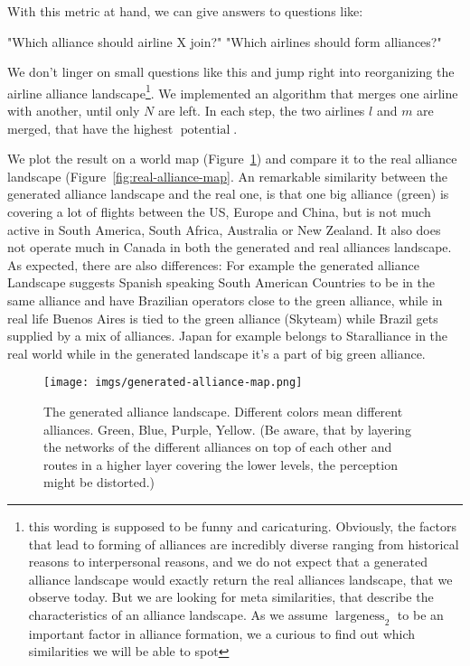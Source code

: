 \documentclass[twocolumn]{tum-article}
\DeclareMathOperator{\Largeness}{largeness}
\DeclareMathOperator{\Potential}{potential}
\begin{document}
With this metric at hand, we can give answers to questions like: 

"Which alliance should airline X join?"
"Which airlines should form alliances?" 


We don't linger on small questions like this and jump right into reorganizing the airline alliance landscape\footnote{this wording is supposed to be funny and caricaturing. Obviously, the factors that lead to forming of alliances are incredibly diverse ranging from historical reasons to interpersonal reasons, and we do not expect that a generated alliance landscape would exactly return the real alliances landscape, that we observe today. But we are looking for meta similarities, that describe the characteristics of an alliance landscape. As we assume $\Largeness_{2}$ to be an important factor in alliance formation, we a curious to find out which similarities we will be able to spot}. We implemented an algorithm that merges one airline with another, until only $N$ are left. In each step, the two airlines $l$ and $m$ are merged, that have the highest $\Potential$.

We plot the result on a world map (Figure~\ref{fig:generated-alliance-map}) and compare it to the real alliance landscape (Figure~\ref{fig:real-alliance-map}. An remarkable similarity between the generated alliance landscape and the real one, is that one big alliance (green) is covering a lot of flights between the US, Europe and China, but is not much active in South America, South Africa, Australia or New Zealand. It also does not operate much in Canada in both the generated and real alliances landscape. 
As expected, there are also differences: For example the generated alliance Landscape suggests Spanish speaking South American Countries to be in the same alliance and have Brazilian operators close to the green alliance, while in real life Buenos Aires is tied to the green alliance (Skyteam) while Brazil gets supplied by a mix of alliances. Japan for example belongs to Staralliance in the real world while in the generated landscape it's a part of big green alliance. 

\begin{figure}
	\centering
	\texttt{[image: imgs/generated-alliance-map.png]}
	\caption{
The generated alliance landscape. Different colors mean different alliances. Green, Blue, Purple, Yellow. (Be aware, that by layering the networks of the different alliances on top of each other and routes in a higher layer covering the lower levels, the perception might be distorted.)}
	\label{fig:generated-alliance-map}
\end{figure}
\end{document}
